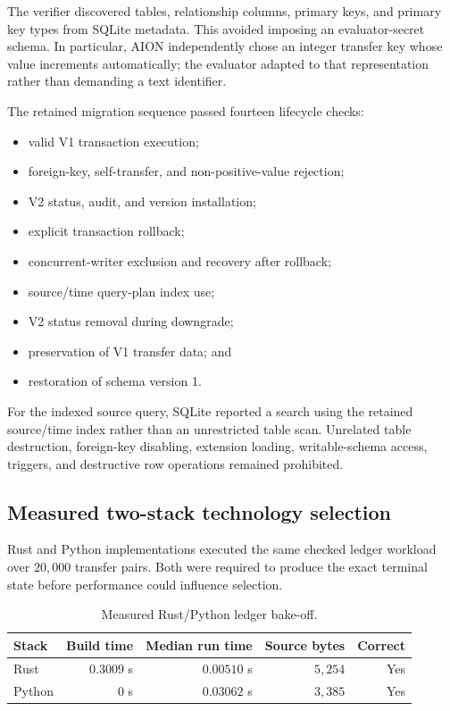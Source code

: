 The verifier discovered tables, relationship columns, primary keys, and primary
key types from SQLite metadata.  This avoided imposing an evaluator-secret
schema.  In particular, AION independently chose an integer transfer key whose
value increments automatically; the evaluator adapted to that representation rather
than demanding a text identifier.

The retained migration sequence passed fourteen lifecycle checks:
\begin{itemize}
  \item valid V1 transaction execution;
  \item foreign-key, self-transfer, and non-positive-value rejection;
  \item V2 status, audit, and version installation;
  \item explicit transaction rollback;
  \item concurrent-writer exclusion and recovery after rollback;
  \item source/time query-plan index use;
  \item V2 status removal during downgrade;
  \item preservation of V1 transfer data; and
  \item restoration of schema version 1.
\end{itemize}

For the indexed source query, SQLite reported a search using the retained
source/time index rather than an unrestricted table scan.  Unrelated table
destruction, foreign-key disabling, extension loading, writable-schema access,
triggers, and destructive row operations remained prohibited.


\subsection{Measured two-stack technology selection}
\label{subsec:measured-stack-selection}

Rust and Python implementations executed the same checked ledger workload over
$20{,}000$ transfer pairs.  Both were required to produce the exact terminal
state before performance could influence selection.

\begin{table}[ht]
\centering
\caption{Measured Rust/Python ledger bake-off.}
\label{tab:rust-python-bakeoff}
\begin{tabular}{lrrrr}
\hline
Stack & Build time & Median run time & Source bytes & Correct \\
\hline
Rust   & $0.3009$ s & $0.00510$ s & $5{,}254$ & Yes \\
Python & $0$ s      & $0.03062$ s & $3{,}385$ & Yes \\
\hline
\end{tabular}
\end{table}

